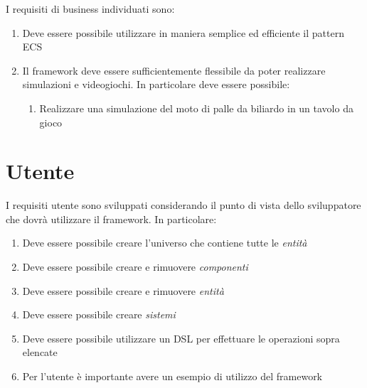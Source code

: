 I requisiti di business individuati sono:
\begin{enumerate}[label=\textbf{\ref{sec:business}.\arabic*}]
    \item \label{itm:b1} Deve essere possibile utilizzare in maniera semplice ed efficiente il pattern ECS
    \item \label{itm:b2} Il framework deve essere sufficientemente flessibile da poter realizzare simulazioni e videogiochi.
    In particolare deve essere possibile:
    \begin{enumerate}[label=\textbf{\ref{itm:b2}.\arabic*}]
        \item \label{itm:bb3} Realizzare una simulazione del moto di palle da biliardo in un tavolo da gioco
    \end{enumerate}
\end{enumerate}

\section{Utente}\label{sec:utente}
I requisiti utente sono sviluppati considerando il punto di vista dello sviluppatore che dovrà utilizzare il framework.
In particolare:
\begin{enumerate}[label=\textbf{\ref{sec:utente}.\arabic*}]
    \item \label{itm:u1} Deve essere possibile creare l'universo che contiene tutte le \textit{entità}
    \item \label{itm:u2} Deve essere possibile creare e rimuovere \textit{componenti}
    \item \label{itm:u3} Deve essere possibile creare e rimuovere \textit{entità}
    \item \label{itm:u4} Deve essere possibile creare \textit{sistemi}
    \item \label{itm:u5} Deve essere possibile utilizzare un DSL per effettuare le operazioni sopra elencate
    \item \label{itm:u6} Per l'utente è importante avere un esempio di utilizzo del framework
\end{enumerate}

